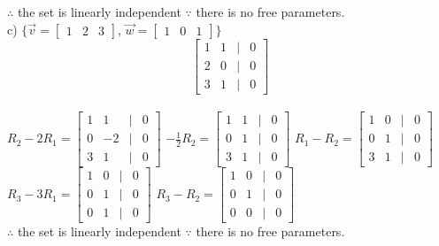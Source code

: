 \documentclass[a4paper]{article}
\begin{document}
$\therefore$ the set is linearly independent $\because$ there is no free parameters.\\
c) $\{\vec{v} = \begin{bmatrix}
1&2&3
\end{bmatrix}$, $\vec{w} = \begin{bmatrix}
1&0&1
\end{bmatrix}\}$\\
$$\begin{bmatrix}
1&1&|&0\\
2&0&|&0\\
3&1&|&0
\end{bmatrix}$$\\
$R_2 - 2R_1 = \begin{bmatrix}
1&1&|&0\\
0&-2&|&0\\
3&1&|&0
\end{bmatrix}$ $-\frac{1}{2}R_2 = \begin{bmatrix}
1&1&|&0\\
0&1&|&0\\
3&1&|&0
\end{bmatrix}$ $R_1 - R_2 = \begin{bmatrix}
1&0&|&0\\
0&1&|&0\\
3&1&|&0
\end{bmatrix}$\\
$R_3 - 3R_1 = \begin{bmatrix}
1&0&|&0\\
0&1&|&0\\
0&1&|&0
\end{bmatrix}$ $R_3 - R_2 = \begin{bmatrix}
1&0&|&0\\
0&1&|&0\\
0&0&|&0
\end{bmatrix}$\\
$\therefore$ the set is linearly independent $\because$ there is no free parameters.\\
\end{document}
